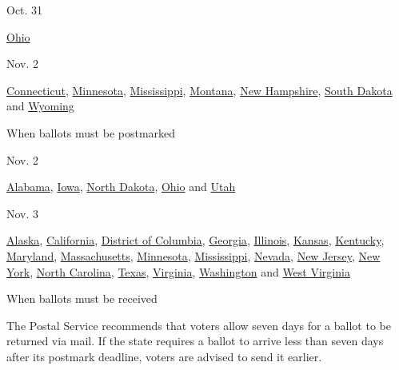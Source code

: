 Oct. 31

\href{https://www.ohiosos.gov/elections/}{Ohio}

Nov. 2

\href{https://portal.ct.gov/SOTS/Common-Elements/V5-Template---Redesign/Elections--Voting--Home-Page}{Connecticut},
\href{https://www.sos.state.mn.us/elections-voting/}{Minnesota},
\href{https://www.sos.ms.gov/Elections-Voting/Pages/default.aspx}{Mississippi},
\href{https://sosmt.gov/elections/}{Montana},
\href{https://sos.nh.gov/Elections.aspx}{New Hampshire},
\href{https://sdsos.gov/elections-voting/default.aspx}{South Dakota} and
\href{https://soswy.state.wy.us/elections}{Wyoming}

When ballots must be postmarked

Nov. 2

\href{https://www.sos.alabama.gov/alabama-votes/voter/absentee-voting}{Alabama},
\href{https://sos.iowa.gov/elections/voterinformation/index.html}{Iowa},
\href{https://vip.sos.nd.gov/PortalList.aspx}{North Dakota},
\href{https://www.ohiosos.gov/elections/}{Ohio} and
\href{https://elections.utah.gov/}{Utah}

Nov. 3

\href{https://www.elections.alaska.gov/Core/votingbymail.php}{Alaska},
\href{https://www.sos.ca.gov/elections}{California},
\href{https://www.dcboe.org/home}{District of Columbia},
\href{}{Georgia}, \href{https://www.elections.il.gov/}{Illinois},
\href{https://sos.kansas.gov/elections/}{Kansas},
\href{https://elect.ky.gov/Pages/default.aspx}{Kentucky},
\href{https://elections.maryland.gov/}{Maryland},
\href{https://www.sec.state.ma.us/ele/eleidx.htm}{Massachusetts},
\href{https://www.sos.state.mn.us/elections-voting/}{Minnesota},
\href{https://www.sos.ms.gov/Elections-Voting/Pages/default.aspx}{Mississippi},
\href{https://www.nvsos.gov/sos/elections}{Nevada},
\href{https://www.state.nj.us/state/elections/index.shtml}{New Jersey},
\href{https://www.elections.ny.gov/}{New York},
\href{https://www.ncsbe.gov/voting/vote-mail}{North Carolina},
\href{https://www.sos.state.tx.us/elections/index.shtml}{Texas},
\href{https://www.elections.virginia.gov/}{Virginia},
\href{https://www.sos.wa.gov/elections/}{Washington} and
\href{https://sos.wv.gov/elections/Pages/default.aspx}{West Virginia}

When ballots must be received

The Postal Service recommends that voters allow seven days for a ballot
to be returned via mail. If the state requires a ballot to arrive less
than seven days after its postmark deadline, voters are advised to send
it earlier.

